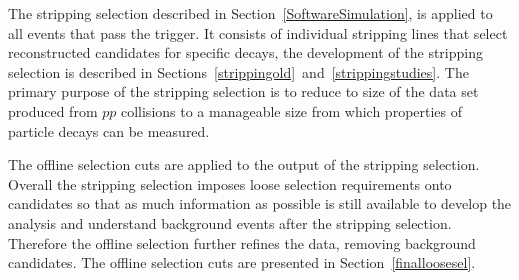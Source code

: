 The stripping selection described in Section~\ref{SoftwareSimulation}, is applied to all events that pass the trigger. It consists of individual stripping lines that select reconstructed candidates for specific decays, the development of the stripping selection is described in Sections~\ref{strippingold}~and~\ref{strippingstudies}. %
The primary purpose of the stripping selection is to reduce to size of the data set produced from $pp$ collisions to a manageable size from which properties of particle decays can be measured. 



The offline selection cuts are applied to the output of the stripping selection. Overall the stripping selection imposes loose selection requirements onto \bmumu candidates so that as much information as possible is still available to develop the analysis and understand background events after the stripping selection. Therefore the offline selection further refines the data, removing background candidates. The offline selection cuts are presented in Section~\ref{finalloosesel}. 


 



